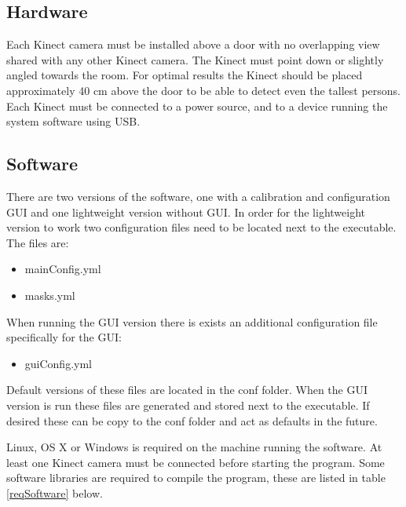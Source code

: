 \subsection{Hardware}
Each Kinect camera must be installed above a door with no overlapping view shared with any other Kinect camera. The Kinect must point down or slightly angled towards the room. For optimal results the Kinect should be placed approximately 40 cm above the door to be able to detect even the tallest persons. Each Kinect must be connected to a power source, and to a device running the system software using USB.

\subsection{Software}
There are two versions of the software, one with a calibration and configuration GUI and one lightweight version without GUI. In order for the lightweight version to work two configuration files need to be located next to the executable. The files are:

\begin{itemize}
\item mainConfig.yml
\item masks.yml
\end{itemize}

When running the GUI version there is exists an additional configuration file specifically for the GUI:

\begin{itemize}
\item guiConfig.yml
\end{itemize}

Default versions of these files are located in the conf folder. When the GUI version is run these files are generated and stored next to the executable. If desired these can be copy to the conf folder and act as defaults in the future.

Linux, OS X or Windows is required on the machine running the software. At least one Kinect camera must be connected before starting the program. Some software libraries are required to compile the program, these are listed in table \ref{reqSoftware} below. \\

